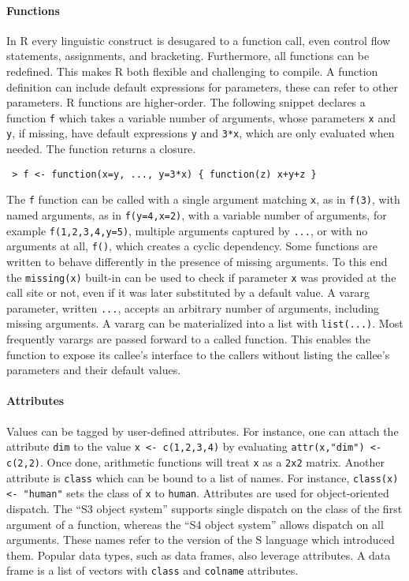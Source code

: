 \documentclass[review,nonacm,screen,acmsmall,anonymous=true]{acmart}
\newcommand{\code}[1]{\lstinline |#1|\xspace}
\renewcommand{\c}[1]{\lstinline |#1|\xspace}
\begin{document}
\paragraph{Functions}
In R every linguistic construct is desugared to a function call, even control
flow statements, assignments, and bracketing. Furthermore, all functions can be
redefined. This makes R both flexible and challenging to compile. A function
definition can include default expressions for parameters, these can refer to
other parameters. R functions are higher-order. The following snippet declares a
function \code f which takes a variable number of arguments, whose parameters
\code x and \code y, if missing, have default expressions \code y and
\code{3*x}, which are only evaluated when needed. The function returns a closure.
\begin{lstlisting}
 > f <- function(x=y, ..., y=3*x) { function(z) x+y+z }
\end{lstlisting}\vspace{1mm}
\noindent
The \code f function can be called with a single argument matching \code x, as in
\code{f(3)}, with named arguments, as in \code{f(y=4,x=2)}, with a variable
number of arguments, for example \code{f(1,2,3,4,y=5)}, multiple arguments
captured by \code{...}, or with no arguments at all, \code{f()}, which creates a
cyclic dependency. Some functions are written to behave differently in the
presence of missing arguments. To this end the \c{missing(x)} built-in can be
used to check if parameter \code{x} was provided at the call site or not, even
if it was later substituted by a default value. A vararg parameter, written
\code{...}, accepts an arbitrary number of arguments, including missing
arguments. A vararg can be materialized into a list with \code{list(...)}. Most
frequently varargs are passed forward to a called function. This enables the
function to expose its callee's interface to the callers without listing the
callee's parameters and their default values.

\paragraph{Attributes}
Values can be tagged by user-defined attributes. For instance, one can attach
the attribute \code{dim} to the value \code{x <- c(1,2,3,4)} by evaluating
\code{attr(x,"dim") <- c(2,2)}. Once done, arithmetic functions will treat \code x
as a \code{2x2} matrix. Another attribute is \code{class} which can be bound to
a list of names. For instance, \code{class(x) <- "human"} sets the class of
\code{x} to \code{human}. Attributes are used for object-oriented dispatch. The
``S3 object system'' supports single dispatch on the class of the first argument
of a function, whereas the ``S4 object system'' allows dispatch on all
arguments. These names refer to the version of the S language which introduced
them. Popular data types, such as data frames, also leverage attributes. A data
frame is a list of vectors with \code{class} and \code{colname} attributes.
\end{document}
